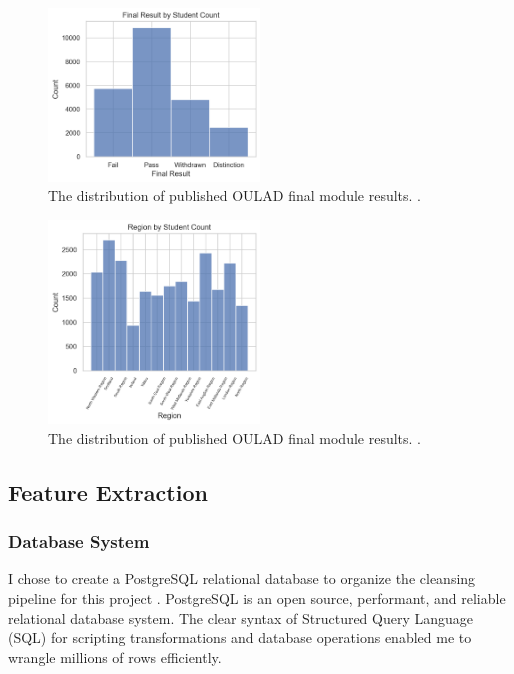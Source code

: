 \documentclass{article}
\begin{document}
            \begin{figure}
                \centering
                \includegraphics[width=0.5\textwidth]{final_result_by_student}
                \caption{The distribution of published OULAD final module results. \cite{oulad}.}
                \label{fig:final_result_by_student}
            \end{figure}
            \begin{figure}
                \centering
                \includegraphics[width=0.5\textwidth]{region_by_student}
                \caption{The distribution of published OULAD final module results. \cite{oulad}.}
                \label{fig:region_by_student}
            \end{figure}
        
        \subsection{Feature Extraction}
        
            \subsubsection{Database System}
                I chose to create a PostgreSQL relational database to organize the cleansing pipeline for this project \cite{postrgesql}.
                PostgreSQL is an open source, performant, and reliable relational database system. 
                The clear syntax of Structured Query Language (SQL) for scripting transformations 
                and database operations enabled me to wrangle millions of rows efficiently.
      
\end{document}

